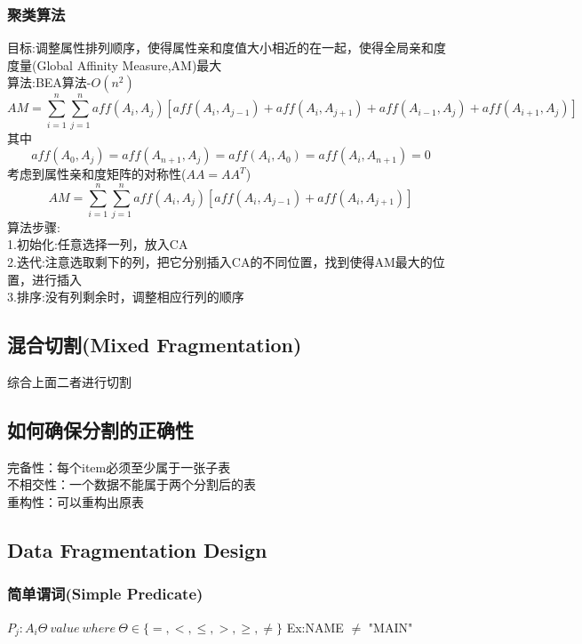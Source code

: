 \documentclass{article}
\begin{document}
\begin{CJK}{UTF8}{gbsn}
	\subsubsection*{聚类算法}
	目标:调整属性排列顺序，使得属性亲和度值大小相近的在一起，使得全局亲和度度量(Global Affinity Measure,AM)最大\\
	算法:BEA算法-$O(n^2)$\\
	\begin{equation*}
	AM=\sum_{i=1}^{n}\sum_{j=1}^naff(A_i,A_j)[aff(A_i,A_{j-1})+aff(A_i,A_{j+1})+aff(A_{i-1},A_j)+aff(A_{i+1},A_j)]
	\end{equation*}	
	其中\\
	\begin{equation*}
	aff(A_0,A_j) = aff(A_{n+1},A_j)=aff(A_i,A_0)=aff(A_i,A_{n+1})=0
	\end{equation*}
	考虑到属性亲和度矩阵的对称性($AA=AA^T$)\\
	\begin{equation*}
	AM=\sum_{i=1}^{n}\sum_{j=1}^naff(A_i,A_j)[aff(A_i,A_{j-1})+aff(A_i,A_{j+1})]
	\end{equation*}	
	算法步骤:\\
	1.初始化:任意选择一列，放入CA\\
	2.迭代:注意选取剩下的列，把它分别插入CA的不同位置，找到使得AM最大的位置，进行插入\\
	3.排序:没有列剩余时，调整相应行列的顺序\\
	\subsection*{混合切割(Mixed Fragmentation)}
	综合上面二者进行切割\\
	\subsection*{如何确保分割的正确性}
	完备性：每个item必须至少属于一张子表\\
	不相交性：一个数据不能属于两个分割后的表\\
	重构性：可以重构出原表\\
	\subsection*{Data Fragmentation Design}
	\subsubsection*{简单谓词(Simple Predicate)}
	$P_j:A_i\Theta\ value\ where\ \Theta\in\lbrace=,<,\leq,>,\geq,\neq \rbrace$
	Ex:NAME $\neq$ "MAIN"\\

\end{CJK}
\end{document}
